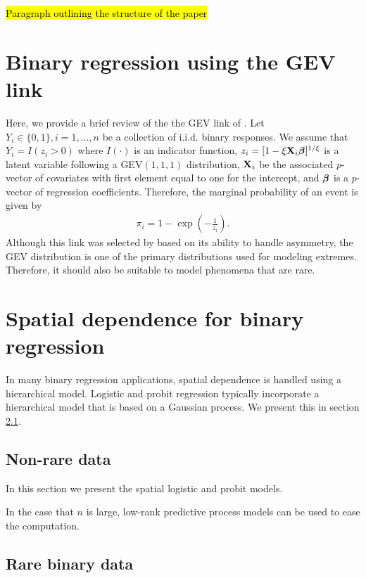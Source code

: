 \documentclass[11pt]{article}
\begin{document}
\hl{Paragraph outlining the structure of the paper}

\section{Binary regression using the GEV link}\label{s:rarebinary}

Here, we provide a brief review of the the GEV link of \citet{Wang2010}.
Let $Y_i \in \{0, 1\}, i = 1, \ldots, n$ be a collection of i.i.d. binary responses.
We assume that $Y_i = I(z_i > 0)$ where $I(\cdot)$ is an indicator function, $z_i = [1 - \xi \mbox{\bf X}_i \mbox{\boldmath $\beta$}]^{1 / \xi}$ is a latent variable following a GEV$(1, 1, 1)$ distribution, $\mbox{\bf X}_i$ be the associated $p$-vector of covariates with first element equal to one for the intercept, and $\mbox{\boldmath $\beta$}$ is a $p$-vector of regression coefficients.
Therefore, the marginal probability of an event is given by
\begin{align} \label{eq:gevlink}
  \pi_i= 1 - \exp \left( -\frac{ 1 }{ z_i } \right).
\end{align}
Although this link was selected by \citeauthor{Wang2010} based on its ability to handle asymmetry, the GEV distribution is one of the primary distributions used for modeling extremes.
Therefore, it should also be suitable to model phenomena that are rare.

\section{Spatial dependence for binary regression}

In many binary regression applications, spatial dependence is handled using a hierarchical model.
Logistic and probit regression typically incorporate a hierarchical model that is based on a Gaussian process.
We present this in section \ref{s:nonrarespatial}.

\subsection{Non-rare data}\label{s:nonrarespatial}

In this section we present the spatial logistic and probit models.

In the case that $n$ is large, low-rank predictive process models can be used to ease the computation.

\subsection{Rare binary data}\label{s:rarebinary}
\end{document}
